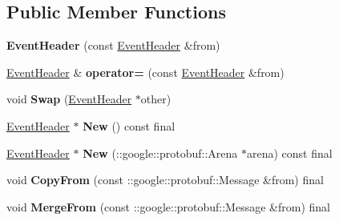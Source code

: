 \subsection*{Public Member Functions}
\begin{DoxyCompactItemize}
\item 
\mbox{\label{classtbMessages_1_1EventHeader_adba34308e967b4a5053b242501ef8c53}} 
{\bfseries Event\+Header} (const \hyperlink{classtbMessages_1_1EventHeader}{Event\+Header} \&from)
\item 
\mbox{\label{classtbMessages_1_1EventHeader_a28cb21111a16edececa80f612a05d520}} 
\hyperlink{classtbMessages_1_1EventHeader}{Event\+Header} \& {\bfseries operator=} (const \hyperlink{classtbMessages_1_1EventHeader}{Event\+Header} \&from)
\item 
\mbox{\label{classtbMessages_1_1EventHeader_adb57d9d23f67c03289729e9e9c3652a8}} 
void {\bfseries Swap} (\hyperlink{classtbMessages_1_1EventHeader}{Event\+Header} $\ast$other)
\item 
\mbox{\label{classtbMessages_1_1EventHeader_ac5a9d2eb2141e28323f0997df801fddd}} 
\hyperlink{classtbMessages_1_1EventHeader}{Event\+Header} $\ast$ {\bfseries New} () const final
\item 
\mbox{\label{classtbMessages_1_1EventHeader_ab69a6498ef99f793bfed5a5967a89841}} 
\hyperlink{classtbMessages_1_1EventHeader}{Event\+Header} $\ast$ {\bfseries New} (\+::google\+::protobuf\+::\+Arena $\ast$arena) const final
\item 
\mbox{\label{classtbMessages_1_1EventHeader_adc7f02971e204c36c27f154b64becd83}} 
void {\bfseries Copy\+From} (const \+::google\+::protobuf\+::\+Message \&from) final
\item 
\mbox{\label{classtbMessages_1_1EventHeader_a24cf60e38d59fbaeb673efb87c0834e6}} 
void {\bfseries Merge\+From} (const \+::google\+::protobuf\+::\+Message \&from) final
\item 
\mbox{\label{classtbMessages_1_1EventHeader_aa5bc5d5fcff70cf341521f9958614d2d}} 

\end{DoxyCompactItemize}

